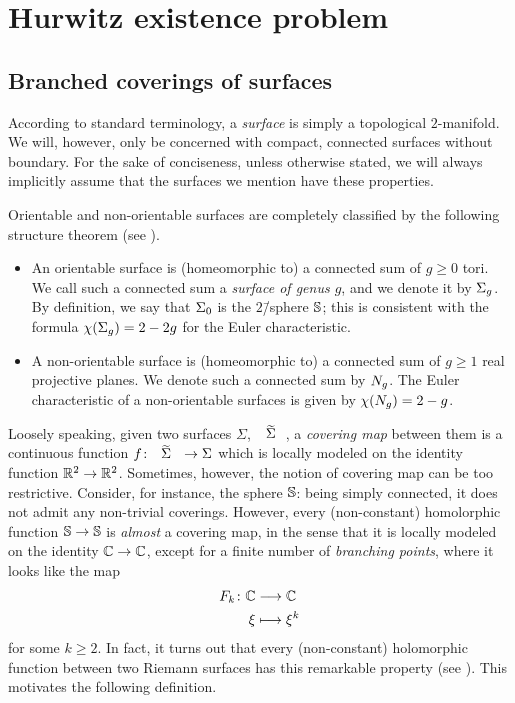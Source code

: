 
\chapter{Hurwitz existence problem}
\largevertices

\section{Branched coverings of surfaces}

According to standard terminology, a \emph{surface} is simply a topological $2$-manifold. We will, however, only be concerned with compact, connected surfaces without boundary. For the sake of conciseness, unless otherwise stated, we will always implicitly assume that the surfaces we mention have these properties.

Orientable and non-orientable surfaces are completely classified by the following structure theorem (see ).
\begin{itemize}
\item An orientable surface is (homeomorphic to) a connected sum of $g\ge 0$ tori. We call such a connected sum a \emph{surface of genus $g$}, and we denote it by $\Sigma_{g}$. By definition, we say that $\Sigma_{0}$ is the $2$\=/sphere $\mathbb{S}{}$; this is consistent with the formula $\chi(\Sigma_{g})=2-2g$ for the Euler characteristic.
\item A non-orientable surface is (homeomorphic to) a connected sum of $g\ge 1$ real projective planes. We denote such a connected sum by $N_{g}$. The Euler characteristic of a non-orientable surfaces is given by $\chi(N_{g})=2-g$.
\end{itemize}


Loosely speaking, given two surfaces $\Sigma$, $\tSigma$, a \emph{covering map} between them is a continuous function $\map{f}{\tSigma}{\Sigma}$ which is locally modeled on the identity function $\umap{\RR^2}{\RR^2}$. Sometimes, however, the notion of covering map can be too restrictive. Consider, for instance, the sphere $\mathbb{S}{}$: being simply connected, it does not admit any non-trivial coverings. However, every (non-constant) homolorphic function $\umap{\sphere{}}{\sphere{}}$ is \emph{almost} a covering map, in the sense that it is locally modeled on the identity $\umap{\CC}{\CC}$, except for a finite number of \emph{branching points}, where it looks like the map
\[
\begin{alignedat}{2} F_k\colon&&\mathbb{C}&\longrightarrow\mathbb{C}\\ &&\xi&\longmapsto\xi^k \end{alignedat}
\]
for some $k\ge 2$. In fact, it turns out that every (non-constant) holomorphic function between two Riemann surfaces has this remarkable property (see ). This motivates the following definition.

